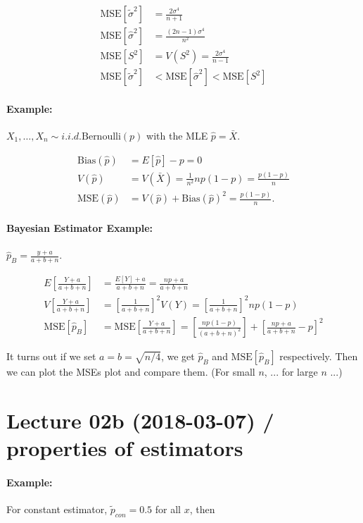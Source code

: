 \documentclass[a4paper, 11pt, twoside]{article}
\begin{document}
\[\begin{split}
\text{MSE}[\tilde{\sigma}^2]&=\frac{2\sigma^4}{n+1}\\
\text{MSE}[\hat{\sigma}^2]&=\frac{(2n-1)\sigma^4}{n^2}\\
\text{MSE}[S^2]&=V(S^2)=\frac{2\sigma^4}{n-1}\\
\text{MSE}[\tilde{\sigma}^2]&<\text{MSE}[\hat{\sigma}^2]<\text{MSE}[S^2]
\end{split}
\]

\paragraph{Example:} $X_1,\dots,X_n\sim i.i.d.\text{Bernoulli}(p)$ with the MLE $\hat{p}=\bar{X}$.

\[\begin{split}
	\text{Bias}(\hat{p})&=E[\hat{p}]-p=0\\
	V(\hat{p})&=V(\bar{X})=\frac1{n^2}np(1-p)=\frac{p(1-p)}{n}\\
	\text{MSE}(\hat{p})&=V(\hat{p})+\text{Bias}(\hat{p})^2 = \frac{p(1-p)}{n}.
\end{split}\]

\paragraph{Bayesian Estimator Example:} $\hat{p}_B=\frac{y+a}{a+b+n}$.

\[\begin{split}
	E\left[\frac{Y+a}{a+b+n}\right]&=\frac{E[Y]+a}{a+b+n}=\frac{np+a}{a+b+n}\\
	V\left[\frac{Y+a}{a+b+n}\right]&=\left[\frac{1}{a+b+n}\right]^2V(Y)=\left[\frac{1}{a+b+n}\right]^2np(1-p)\\
	\text{MSE}[\hat{p}_B]&=\text{MSE}\left[\frac{Y+a}{a+b+n}\right]=\left[\frac{np(1-p)}{(a+b+n)^2}\right]+\left[\frac{np+a}{a+b+n}-p\right]^2
\end{split}\]

It turns out if we set $a=b=\sqrt{n/4}$, we get $\hat{p}_B$ and $\text{MSE}[\hat{p}_B]$ respectively. Then we can plot the MSEs plot and compare them. (For small $n$, ... for large $n$ ...)

\pagebreak

\section{Lecture 02b (2018-03-07) / properties of estimators}

\paragraph{Example:} For constant estimator, $\tilde{p}_{con}=0.5$ for all $x$, then
\end{document}
